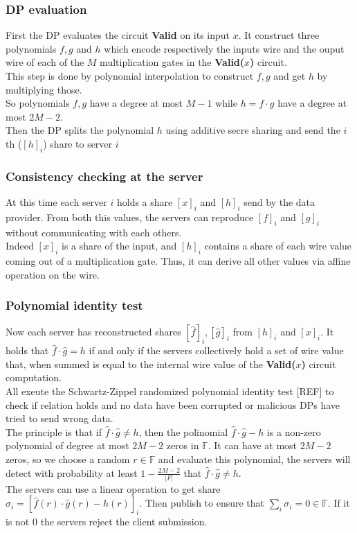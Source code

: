 \documentclass{article}
\begin{document}
\subsubsection{DP evaluation}
First the DP evaluates the circuit \textbf{Valid} on its input $x$. It construct three polynomials $f,g $ and $h$ which encode respectively the inputs wire and the ouput wire of each of the $M$ multiplication gates in the \textbf{Valid($x$)} circuit.\\
This step is done by polynomial interpolation to construct $f,g$ and get $h$ by multiplying those.\\
So polynomials $f,g$ have a degree at most $M-1$ while $h = f \cdot g$ have a degree at most $2M-2$.\\
Then the DP splits the polynomial $h$ using additive secre sharing and send the $i$th ($[h]_i$) share to server $i$
\subsubsection{Consistency checking at the server}
At this time each server $i$ holds a share $[x]_i$ and $[h]_i$ send by the data provider. From both this values, the servers can reproduce $[f]_i$ and $[g]_i$ without communicating with each others.\\
Indeed $[x]_i$ is a share of the input, and $[h]_i$ contains a share of each wire value coming out of a multiplication gate. Thus, it can derive all other values via affine operation on the wire.
\subsubsection{Polynomial identity test}
Now each server has reconstructed shares $[\hat{f}]_i, [\hat{g}]_i$ from $[h]_i$ and $[x]_i$. It holds that $ \hat{f} \cdot \hat{g} = h$ if and only if the servers collectively hold a set of wire value that, when summed is equal to the internal wire value of the \textbf{Valid($x$)} circuit computation.\\
All exeute the Schwartz-Zippel randomized polynomial identity test [REF] to check if relation holds and no data have been corrupted or malicious DPs have tried to send wrong data.\\
The principle is that if $ \hat{f} \cdot \hat{g} \neq h$, then the polinomial $ \hat{f} \cdot \hat{g} - h$ is a non-zero polynomial of degree at most $2M-2$ zeros in $\mathbb{F}$. It can have at most $2M-2$ zeros, so we choose a random $r \in \mathbb{F}$ and evaluate this polynomial, the servers will detect with probability at least $1 - \frac{2M-2}{|F|}$ that $ \hat{f} \cdot \hat{g} \neq h$.\\
The servers can use a linear operation to get share $\sigma_i = [ \hat{f}(r) \cdot \hat{g}(r) - h(r)]_i$. Then publish to ensure that $\sum_{i}{\sigma_i} = 0 \in \mathbb{F}$. If it is not $0$ the servers reject the client submission.
\end{document}
